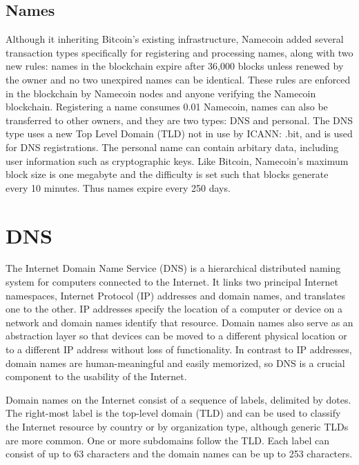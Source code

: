 \subsection{Names}

Although it inheriting Bitcoin's existing infrastructure, Namecoin added several transaction types specifically for registering and processing names, along with two new rules: names in the blockchain expire after 36,000 blocks unless renewed by the owner and no two unexpired names can be identical. These rules are enforced in the blockchain by Namecoin nodes and anyone verifying the Namecoin blockchain. Registering a name consumes 0.01 Namecoin, names can also be transferred to other owners, and they are two types: DNS and personal. The DNS type uses a new Top Level Domain (TLD) not in use by ICANN: .bit, and is used for DNS registrations. The personal name can contain arbitary data, including user information such as cryptographic keys. Like Bitcoin, Namecoin's maximum block size is one megabyte and the difficulty is set such that blocks generate every 10 minutes. Thus names expire every 250 days. 





\section{DNS}

The Internet Domain Name Service (DNS) is a hierarchical distributed naming system for computers connected to the Internet. It links two principal Internet namespaces, Internet Protocol (IP) addresses and domain names, and translates one to the other. IP addresses specify the location of a computer or device on a network and domain names identify that resource. Domain names also serve as an abstraction layer so that devices can be moved to a different physical location or to a different IP address without loss of functionality. In contrast to IP addresses, domain names are human-meaningful and easily memorized, so DNS is a crucial component to the usability of the Internet.

Domain names on the Internet consist of a sequence of labels, delimited by dotes. The right-most label is the top-level domain (TLD) and can be used to classify the Internet resource by country or by organization type, although generic TLDs are more common. One or more subdomains follow the TLD. Each label can consist of up to 63 characters and the domain names can be up to 253 characters.  